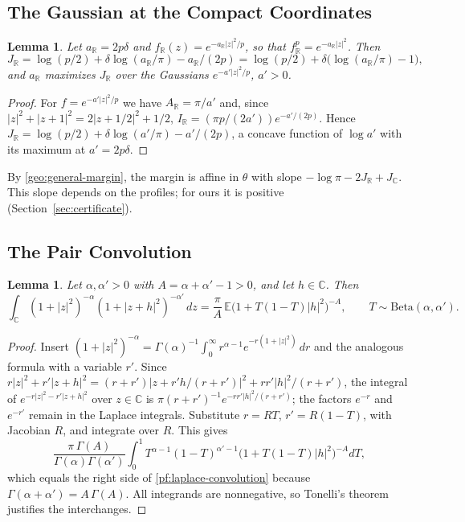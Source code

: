 \documentclass[11pt]{amsart}
\numberwithin{equation}{section}
\newtheorem{lemma}[equation]{Lemma}
\theoremstyle{definition}
\theoremstyle{remark}
\newcommand{\R}{\mathbb R}
\newcommand{\C}{\mathbb C}
\begin{document}
\subsection{The Gaussian at the Compact Coordinates}

\begin{lemma}\label{pf:gaussian}
Let $a_\R=2p\delta$ and $f_\R(z)=e^{-a_\R|z|^2/p}$, so that
$f_\R^p=e^{-a_\R|z|^2}$. Then
\begin{equation}\label{pf:gaussian-compact}
 J_\R=\log(p/2)+\delta\log(a_\R/\pi)-a_\R/(2p)
 =\log(p/2)+\delta\bigl(\log(a_\R/\pi)-1\bigr),
\end{equation}
and $a_\R$ maximizes $J_\R$ over the Gaussians $e^{-a'|z|^2/p}$, $a'>0$.
\end{lemma}

\begin{proof}
For $f=e^{-a'|z|^2/p}$ we have $A_\R=\pi/a'$ and, since
$|z|^2+|z+1|^2=2|z+1/2|^2+1/2$, $I_\R=(\pi p/(2a'))e^{-a'/(2p)}$. Hence
$J_\R=\log(p/2)+\delta\log(a'/\pi)-a'/(2p)$, a concave function of
$\log a'$ with its maximum at $a'=2p\delta$.
\end{proof}

By \eqref{geo:general-margin}, the margin is affine in $\theta$ with
slope $-\log\pi-2J_\R+J_\C$. This slope depends on the profiles; for
ours it is positive (Section~\ref{sec:certificate}).

\subsection{The Pair Convolution}

\begin{lemma}\label{pf:laplace}
Let $\alpha,\alpha'>0$ with $A=\alpha+\alpha'-1>0$, and let $h\in\C$.
Then
\begin{equation}\label{pf:laplace-convolution}
 \int_{\C}(1+|z|^2)^{-\alpha}(1+|z+h|^2)^{-\alpha'}\,dz
 =\frac\pi A\,\mathbb E\bigl(1+T(1-T)|h|^2\bigr)^{-A},
 \qquad T\sim\mathrm{Beta}(\alpha,\alpha').
\end{equation}
\end{lemma}

\begin{proof}
Insert
$(1+|z|^2)^{-\alpha}=\Gamma(\alpha)^{-1}\int_0^\infty
r^{\alpha-1}e^{-r(1+|z|^2)}\,dr$ and the analogous formula with a
variable $r'$. Since
$r|z|^2+r'|z+h|^2=(r+r')|z+r'h/(r+r')|^2+rr'|h|^2/(r+r')$, the
integral of $e^{-r|z|^2-r'|z+h|^2}$ over $z\in\C$ is
$\pi(r+r')^{-1}e^{-rr'|h|^2/(r+r')}$; the factors $e^{-r}$ and
$e^{-r'}$ remain in the Laplace integrals. Substitute $r=RT$,
$r'=R(1-T)$, with Jacobian $R$, and integrate over $R$. This gives
\[
 \frac{\pi\,\Gamma(A)}{\Gamma(\alpha)\Gamma(\alpha')}
 \int_0^1T^{\alpha-1}(1-T)^{\alpha'-1}\bigl(1+T(1-T)|h|^2\bigr)^{-A}dT,
\]
which equals the right side of \eqref{pf:laplace-convolution} because
$\Gamma(\alpha+\alpha')=A\,\Gamma(A)$. All integrands are nonnegative,
so Tonelli's theorem justifies the interchanges.
\end{proof}
\end{document}
